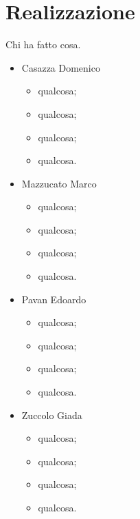 \section{Realizzazione}
Chi ha fatto cosa.
\begin{itemize}
	\item Casazza Domenico
	\begin{itemize}
		\item qualcosa;
		\item qualcosa;
		\item qualcosa;
		\item qualcosa.
	\end{itemize}
	\item Mazzucato Marco
	\begin{itemize}
		\item qualcosa;
		\item qualcosa;
		\item qualcosa;
		\item qualcosa.
	\end{itemize}	
	\item Pavan Edoardo
	\begin{itemize}
		\item qualcosa;
		\item qualcosa;
		\item qualcosa;
		\item qualcosa.
	\end{itemize}
	\item Zuccolo Giada
	\begin{itemize}
		\item qualcosa;
		\item qualcosa;
		\item qualcosa;
		\item qualcosa.
	\end{itemize}
\end{itemize}